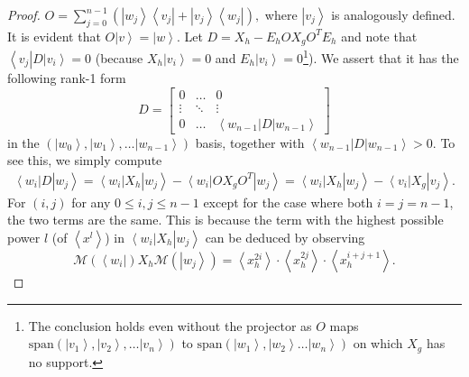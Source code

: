 \documentclass{article}
\begin{document}
\begin{proof}
  $
    O=\sum_{j=0}^{n-1}\left(\left|w_{j}\right\rangle \left\langle v_{j}\right|+\left|v_{j}\right\rangle \left\langle w_{j}\right|\right),
  $
  where $\left|v_{j}\right\rangle $ is analogously defined. It is evident that $O\left|v\right\rangle =\left|w\right\rangle $.
  Let $D=X_{h}-E_{h}OX_{g}O^{T}E_{h}$ and note that $\left\langle v_{j}\right|D\left|v_{i}\right\rangle =0$
  (because $X_{h}\left|v_{i}\right\rangle =0$ and $E_{h}\left|v_{i}\right\rangle =0$\footnote{The conclusion holds even without the projector as $O$ maps $\text{span}(\left|v_{1}\right\rangle ,\left|v_{2}\right\rangle ,\dots\left|v_{n}\right\rangle )$
    to $\text{span}(\left|w_{1}\right\rangle ,\left|w_{2}\right\rangle \dots\left|w_{n}\right\rangle )$
    on which $X_{g}$ has no support.}). We assert that it has the following rank-1 form
  \begin{displaymath}
    D=\left[\begin{array}{cccc}
        0      & \dots  & 0                                                      \\
        \vdots & \ddots & \vdots                                                 \\
        0      & \dots  & \left\langle w_{n-1}\right|D\left|w_{n-1}\right\rangle
      \end{array}\right]
  \end{displaymath}
  in the $\left(\left|w_{0}\right\rangle ,\left|w_{1}\right\rangle ,\dots\left|w_{n-1}\right\rangle \right)$
  basis, together with $\left\langle w_{n-1}\right|D\left|w_{n-1}\right\rangle >0$.
  To see this, we simply compute
  \begin{align*}
    \left\langle w_{i}\right|D\left|w_{j}\right\rangle   =\left\langle w_{i}\right|X_{h}\left|w_{j}\right\rangle -\left\langle w_{i}\right|OX_{g}O^{T}\left|w_{j}\right\rangle  =\left\langle w_{i}\right|X_{h}\left|w_{j}\right\rangle -\left\langle v_{i}\right|X_{g}\left|v_{j}\right\rangle .
  \end{align*}
  For $(i,j)$ for any $0\le i,j\le n-1$ except for the case where
  both $i=j=n-1$, the two terms are the same. This is because the term
  with the highest possible power $l$ (of $\left\langle x^{l}\right\rangle $)
  in $\left\langle w_{i}\right|X_{h}\left|w_{j}\right\rangle $ can
  be deduced by observing
  \begin{equation}
    \mathcal{M}(\left\langle w_{i}\right|)X_{h}\mathcal{M}(\left|w_{j}\right\rangle )=\left\langle x_{h}^{2i}\right\rangle \cdot\left\langle x_{h}^{2j}\right\rangle \cdot\left\langle x_{h}^{i+j+1}\right\rangle .\label{eq:highestPowerInH}

\end{equation}
\end{proof}
\end{document}
